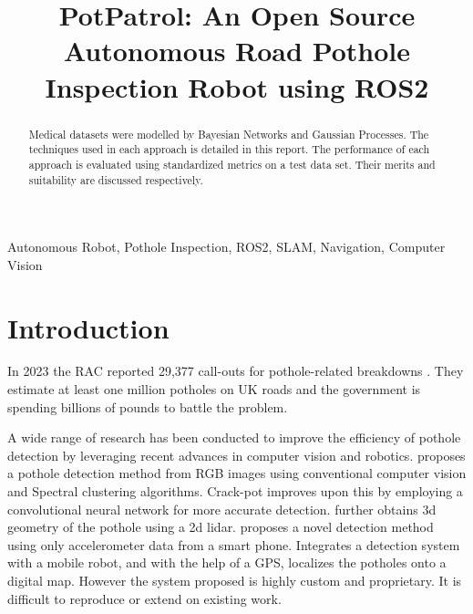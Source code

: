 \documentclass[conference]{IEEEtran}
\begin{document}
\title{PotPatrol: An Open Source Autonomous Road Pothole Inspection Robot using ROS2}

\author{
}

\maketitle

\begin{abstract}
Medical datasets were modelled by Bayesian Networks and Gaussian Processes.
The techniques used in each approach is detailed in this report.
The performance of each approach is evaluated using standardized metrics on a test data set.
Their merits and suitability are discussed respectively.
\end{abstract}

\begin{IEEEkeywords}
Autonomous Robot, Pothole Inspection, ROS2, SLAM, Navigation, Computer Vision
\end{IEEEkeywords}

\section{Introduction}

In 2023 the RAC reported 29,377 call-outs for pothole-related breakdowns \cite{RACPotholeIndex}. They estimate at least one million potholes on UK roads and the government is spending billions of pounds to battle the problem.

A wide range of research has been conducted to improve the efficiency of pothole detection by leveraging recent advances in computer vision and robotics. \cite{omanovicPotholeDetectionImage2013} proposes a pothole detection method from RGB images using conventional computer vision and Spectral clustering algorithms. Crack-pot \cite{anandCrackpotAutonomousRoad2018} improves upon this by employing a convolutional neural network for more accurate detection. \cite{kangPotholeDetectionSystem2017} further obtains 3d geometry of the pothole using a 2d lidar. \cite{RealTimePothole} proposes a novel detection method using only accelerometer data from a smart phone.
\cite{brunoRobotizedRaspberryBasedSystem2023} Integrates a detection system with a mobile robot, and with the help of a GPS, localizes the potholes onto a digital map. However the system proposed is highly custom and proprietary. It is difficult to reproduce or extend on existing work.
\end{document}
